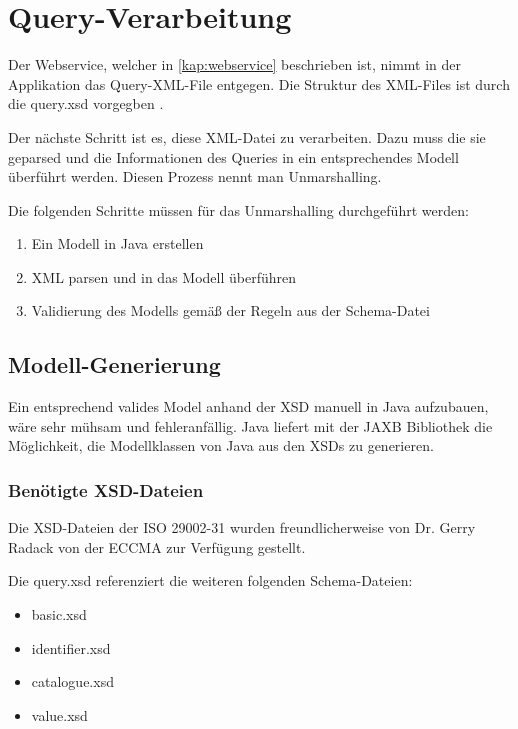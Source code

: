 \section{Query-Verarbeitung}\label{sec:query_vearbeitung}

Der \gls{Webservice}, welcher in \autoref{kap:webservice} beschrieben ist, nimmt in der Applikation das Query-XML-File entgegen. 
Die Struktur des XML-Files ist durch die query.xsd vorgegben \citep[27]{iso29002-31}. 

Der nächste Schritt ist es, diese XML-Datei zu verarbeiten. Dazu muss die sie geparsed und die Informationen des Queries in ein entsprechendes Modell überführt werden. Diesen Prozess nennt man \gls{Unmarshalling}. 

Die folgenden Schritte müssen für das \gls{Unmarshalling} durchgeführt werden:

\begin{enumerate}
\item Ein Modell in Java erstellen
\item XML parsen und in das Modell überführen
\item Validierung des Modells gemäß der Regeln aus der Schema-Datei
\end{enumerate}

\subsection{Modell-Generierung}\label{sec:modellgenerierung}

Ein entsprechend valides Model anhand der XSD manuell in Java aufzubauen, wäre sehr mühsam und fehleranfällig. Java liefert mit der \gls{JAXB} Bibliothek die Möglichkeit, die Modellklassen von Java aus den XSDs zu generieren.

\subsubsection{Benötigte XSD-Dateien}

Die XSD-Dateien der ISO 29002-31 wurden freundlicherweise von Dr. Gerry Radack von der \gls{ECCMA} zur Verfügung gestellt. 

Die query.xsd referenziert die weiteren folgenden Schema-Dateien:
\begin{itemize}
\item basic.xsd
\item identifier.xsd
\item catalogue.xsd
\item value.xsd
\end{itemize}


